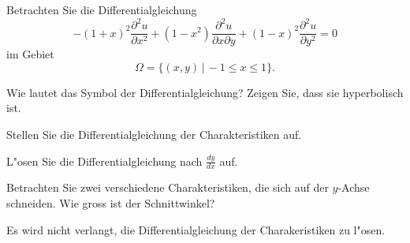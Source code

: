 Betrachten Sie die Differentialgleichung
\[
-(1+x)^2\frac{\partial^2u}{\partial x^2}
+(1-x^2)\frac{\partial^2u}{\partial x\partial y}
+(1-x)^2\frac{\partial^2u}{\partial y^2}=0
\]
im Gebiet
\[
\Omega=\{(x,y)\,|\, -1\le x \le 1\}.
\]
\begin{teilaufgaben}
\item Wie lautet das Symbol der Differentialgleichung? Zeigen Sie, dass sie
hyperbolisch ist.
\item Stellen Sie die Differentialgleichung der Charakteristiken auf.
\item L"osen Sie die Differentialgleichung nach $\frac{dy}{dx}$ auf.
\item Betrachten Sie zwei verschiedene Charakteristiken, die sich
auf der $y$-Achse schneiden. Wie gross ist der Schnittwinkel?
\end{teilaufgaben}

\begin{hinweis}
Es wird nicht verlangt, die Differentialgleichung
der Charakeristiken zu l"osen.
\end{hinweis}

